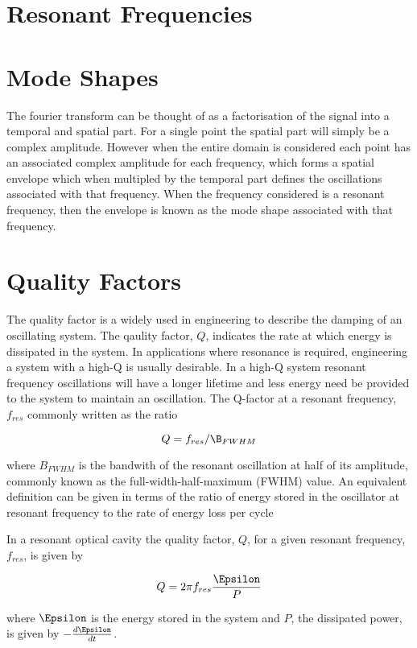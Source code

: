 \section{Resonant Frequencies}
\section{Mode Shapes}

The fourier transform can be thought of as a factorisation of the signal into a temporal and spatial part. For a single point the spatial part will simply be a complex amplitude. However when the entire domain is considered each point has an associated complex amplitude for each frequency, which forms a spatial envelope which when multipled by the temporal part defines the oscillations associated with that frequency. When the frequency considered is a resonant frequency, then the envelope is known as the mode shape associated with that frequency.

\section{Quality Factors}

The quality factor is a widely used in engineering to describe the damping of an oscillating system. The qaulity factor, $Q$, indicates the rate at which energy is dissipated in the system. In applications where resonance is required, engineering a system with a high-Q is usually desirable. In a high-Q system resonant frequency oscillations will have a longer lifetime and less energy need be provided to the system to maintain an oscillation. The Q-factor at a resonant frequency, $f_{res}$ commonly written as the ratio

$$
Q = f_{res}/\B_{FWHM}
$$

where $B_{FWHM}$ is the bandwith of the resonant oscillation at half of its amplitude, commonly known as the full-width-half-maximum (FWHM) value. An equivalent definition can be given in terms of the ratio of energy stored in the oscillator at resonant frequency to the rate of energy loss per cycle

In a resonant optical cavity the quality factor, $Q$, for a given resonant frequency, $f_{res}$, is given by

$$
Q = 2 \pi f_{res} \frac{\Epsilon}{P}
$$

where $\Epsilon$ is the energy stored in the system and $P$, the dissipated power, is given by $-\frac{d \Epsilon}{dt}$.

